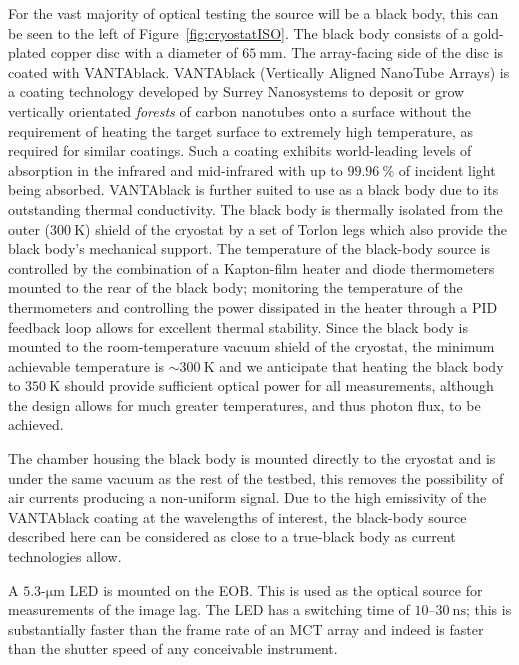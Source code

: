 \documentclass{spie}
\begin{document}
\par
For the vast majority of optical testing the source will be a black body, this can be seen to the left of Figure~\ref{fig:cryostatISO}. The black body consists of a gold-plated copper disc with a diameter of $65~\si{\milli\metre}$. The array-facing side of the disc is coated with VANTAblack. VANTAblack (Vertically Aligned NanoTube Arrays) is a coating technology developed by Surrey Nanosystems to deposit or grow vertically orientated \textit{forests} of carbon nanotubes onto a surface without the requirement of heating the target surface to extremely high temperature, as required for similar coatings.\cite{Theocharous06,Theocharous14} Such a coating exhibits world-leading levels of absorption in the infrared and mid-infrared with up to $99.96~\%$ of incident light being absorbed.\cite{Mizuno09} VANTAblack is further suited to use as a black body due to its outstanding thermal conductivity\cite{Berber2000}. The black body is thermally isolated from the outer ($300~\si{\kelvin}$) shield of the cryostat by a set of Torlon legs which also provide the black body's mechanical support. The temperature of the black-body source is controlled by the combination of a Kapton-film heater and diode thermometers mounted to the rear of the black body; monitoring the temperature of the thermometers and controlling the power dissipated in the heater through a PID feedback loop allows for excellent thermal stability. Since the black body is mounted to the room-temperature vacuum shield of the cryostat, the minimum achievable temperature is $\sim 300~\si{\kelvin}$ and we anticipate that heating the black body to $350~\si{\kelvin}$ should provide sufficient optical power for all measurements, although the design allows for much greater temperatures, and thus photon flux, to be achieved.
\par
The chamber housing the black body is mounted directly to the cryostat and is under the same vacuum as the rest of the testbed, this removes the possibility of air currents producing a non-uniform signal. Due to the high emissivity of the VANTAblack coating at the wavelengths of interest, the black-body source described here can be considered as close to a true-black body as current technologies allow. 
\par 
A $5.3\mbox{-}\si{\micro\metre}$ LED is mounted on the EOB. This is used as the optical source for measurements of the image lag. The LED has a switching time of $10\mbox{--}30~\si{\nano\second}$; this is substantially faster than the frame rate of an MCT array and indeed is faster than the shutter speed of any conceivable instrument.
\end{document}
